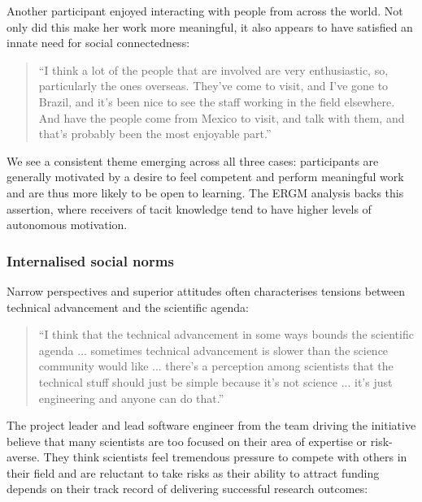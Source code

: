  Another participant enjoyed interacting with people from across the world. Not only did this make her work more meaningful, it also appears to have satisfied an innate need for social connectedness:
 
 \begin{quote}
\small
\enquote{I think a lot of the people that are involved are very enthusiastic, so, particularly the ones overseas. They've come to visit, and I've gone to Brazil, and it's been nice to see the staff working in the field elsewhere. And have the people come from Mexico to visit, and talk with them, and that's probably been the most enjoyable part.} \\
\end{quote}

We see a consistent theme emerging across all three cases: participants are generally motivated by a desire to feel competent and perform meaningful work and are thus more likely to be open to learning. The ERGM analysis backs this assertion, where receivers of tacit knowledge tend to have higher levels of autonomous motivation.

\subsubsection{Internalised social norms}

Narrow perspectives and superior attitudes often characterises tensions between technical advancement and the scientific agenda:

\begin{quote}
\small
\enquote{I think that the technical advancement in some ways bounds the scientific agenda ... sometimes technical advancement is slower than the science community would like ... there's a perception among scientists that the technical stuff should just be simple because it's not science ... it's just engineering and anyone can do that.} \\
\end{quote}

The project leader and lead software engineer from the team driving the initiative believe that many scientists are too focused on their area of expertise or risk-averse. They think scientists feel tremendous pressure to compete with others in their field and are reluctant to take risks as their ability to attract funding depends on their track record of delivering successful research outcomes:

